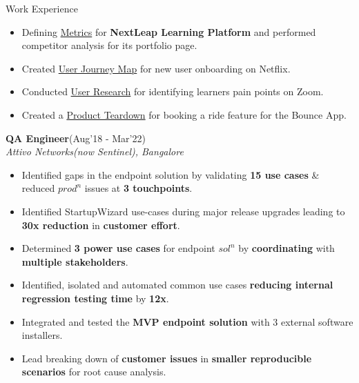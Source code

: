\documentclass{resume}
\newcommand{\sepval}{-0.5em}
\begin{document}
\begin{rSection}{Work Experience}
\begin{itemize}[leftmargin=*]
	\item Defining \href{https://drive.google.com/file/d/1-avX66iiwxiya52PV7Py78P-dR9KBc26/view?usp=sharing}{Metrics} for {\bf NextLeap Learning Platform} and performed competitor analysis for its portfolio page.

	\item Created \href{https://drive.google.com/file/d/1-avX66iiwxiya52PV7Py78P-dR9KBc26/view?usp=sharing}{User Journey Map} for new user onboarding on Netflix.

	\item Conducted \href{https://drive.google.com/file/d/1-avX66iiwxiya52PV7Py78P-dR9KBc26/view?usp=sharing}{User Research} for identifying learners pain points on Zoom.

	\item Created a \href{https://drive.google.com/file/d/1KT8zrRtvo1okBxOsbrlV3yusbd8QLe2w/view?usp=sharing}{Product Teardown}  for booking a ride feature for the Bounce App.

\end{itemize}

\vspace{-.2cm}
 
\item{\bf {\bf QA Engineer}}\hfill{(Aug'18 - Mar'22)}\\
\emph{Attivo Networks(now Sentinel), Bangalore}\\
[-0.4cm]

\begin{itemize}[leftmargin=*]

	\itemsep \sepval

	\item Identified gaps in the endpoint solution by validating {\bf 15 use cases} \& reduced $prod^{n}$ issues at {\bf 3 touchpoints}.

	\item Identified StartupWizard use-cases during major release upgrades leading to {\bf 30x reduction} in {\bf customer effort}.

	\item Determined {\bf 3 power use cases} for endpoint $sol^{n}$ by {\bf coordinating} with {\bf multiple stakeholders}.

	\item Identified, isolated and automated common use cases {\bf reducing internal regression testing time} by {\bf 12x}.
	
	\item Integrated and tested the {\bf MVP endpoint solution} with 3 external software installers.

	\item Lead breaking down of {\bf customer issues} in {\bf smaller reproducible scenarios} for root cause analysis.

\end{itemize}

\end{rSection}
\end{document}
